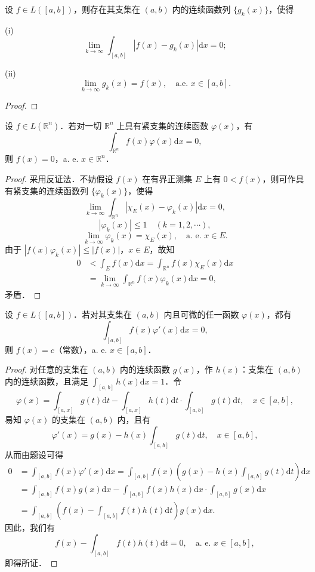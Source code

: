 \documentclass[../../main.tex]{subfiles}
\begin{document}
\begin{corollary}
设 \( f \in L([a,b]) \)，则存在其支集在 \( (a,b) \) 内的连续函数列 \( \{ g_k(x) \} \)，使得

(i)
\[
\lim_{k \to \infty} \int_{[a,b]} |f(x) - g_k(x)| \mathrm{d}x = 0;
\]

(ii)
\[
\lim_{k \to \infty} g_k(x) = f(x), \quad \text{a.e. } x \in [a,b].
\]
\end{corollary}
\begin{proof}

\end{proof}

\begin{example}
设 \( f \in L(\mathbb{R}^n) \)．若对一切 \( \mathbb{R}^n \) 上具有紧支集的连续函数 \( \varphi(x) \)，有
\[
\int_{\mathbb{R}^n} f(x)\varphi(x) \mathrm{d}x = 0,
\]
则 \( f(x) = 0 \)，a. e. \( x \in \mathbb{R}^n \)．
\end{example}
\begin{proof}
采用反证法．不妨假设 \( f(x) \) 在有界正测集 \( E \) 上有 \( 0 < f(x) \)，则可作具有紧支集的连续函数列 \( \{ \varphi_k(x) \} \)，使得
\[
\lim_{k \to \infty} \int_{\mathbb{R}^n} |\chi_E(x) - \varphi_k(x)| \mathrm{d}x = 0,
\]
\[
|\varphi_k(x)| \leqslant 1 \quad (k = 1,2,\cdots),
\]
\[
\lim_{k \to \infty} \varphi_k(x) = \chi_E(x), \quad \text{a. e. } x \in E.
\]
由于 \( |f(x)\varphi_k(x)| \leqslant |f(x)| \)，\( x \in E \)，故知
\begin{align*}
0 &< \int_E f(x) \mathrm{d}x = \int_{\mathbb{R}^n} f(x)\chi_E(x) \mathrm{d}x \\
&= \lim_{k \to \infty} \int_{\mathbb{R}^n} f(x)\varphi_k(x) \mathrm{d}x = 0,
\end{align*}
矛盾．
\end{proof}

\begin{example}
设 \( f \in L([a,b]) \)．若对其支集在 \( (a,b) \) 内且可微的任一函数 \( \varphi(x) \)，都有
\[
\int_{[a,b]} f(x)\varphi'(x) \mathrm{d}x = 0,
\]
则 \( f(x) = c \)（常数），a. e. \( x \in [a,b] \)．
\end{example}
\begin{proof}
对任意的支集在 \( (a,b) \) 内的连续函数 \( g(x) \)，作 \( h(x) \)：支集在 \( (a,b) \) 内的连续函数，且满足 \( \int_{[a,b]} h(x) \mathrm{d}x = 1 \)．令
\[
\varphi(x) = \int_{[a,x]} g(t) \mathrm{d}t - \int_{[a,x]} h(t) \mathrm{d}t \cdot \int_{[a,b]} g(t) \mathrm{d}t, \quad x \in [a,b],
\]
易知 \( \varphi(x) \) 的支集在 \( (a,b) \) 内，且有
\[
\varphi'(x) = g(x) - h(x)\int_{[a,b]} g(t) \mathrm{d}t, \quad x \in [a,b],
\]
从而由题设可得
\begin{align*}
0 &= \int_{[a,b]} f(x)\varphi'(x) \mathrm{d}x = \int_{[a,b]} f(x)\left( g(x) - h(x)\int_{[a,b]} g(t) \mathrm{d}t \right) \mathrm{d}x \\
&= \int_{[a,b]} f(x)g(x) \mathrm{d}x - \int_{[a,b]} f(x)h(x) \mathrm{d}x \cdot \int_{[a,b]} g(x) \mathrm{d}x \\
&= \int_{[a,b]} \left( f(x) - \int_{[a,b]} f(t)h(t) \mathrm{d}t \right) g(x) \mathrm{d}x.
\end{align*}
因此，我们有
\[
f(x) - \int_{[a,b]} f(t)h(t) \mathrm{d}t = 0, \quad \text{a. e. } x \in [a,b],
\]
即得所证．
\end{proof}
\end{document}

